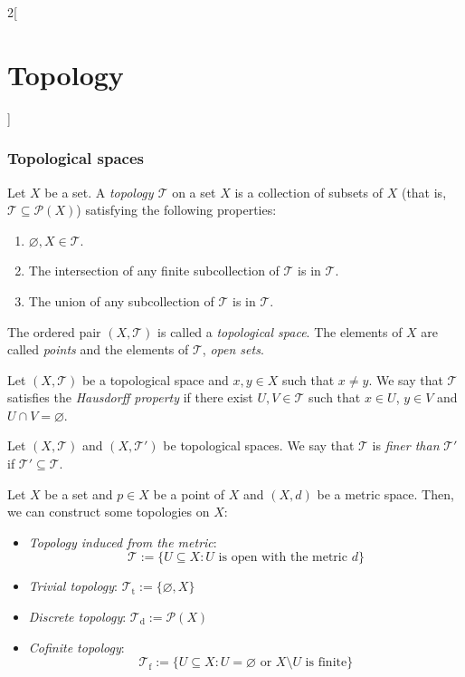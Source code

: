 \documentclass[../../../main.tex]{subfiles}
\begin{document}
\begin{multicols}{2}[\section{Topology}]
  \subsubsection{Topological spaces}
  \begin{definition}
    Let $X$ be a set. A \textit{topology $\mathcal{T}$} on a set $X$ is a collection of subsets of $X$ (that is, $\mathcal{T}\subseteq\mathcal{P}(X)$) satisfying the following properties:
    \begin{enumerate}
      \item $\varnothing, X\in\mathcal{T}$.
      \item The intersection of any finite subcollection of $\mathcal{T}$ is in $\mathcal{T}$.
      \item The union of any subcollection of $\mathcal{T}$ is in $\mathcal{T}$.
    \end{enumerate}
    The ordered pair $(X,\mathcal{T})$ is called a \textit{topological space}. The elements of $X$ are called \textit{points} and the elements of $\mathcal{T}$, \textit{open sets}.
  \end{definition}
  \begin{definition}
    Let $(X,\mathcal{T})$ be a topological space and $x,y\in X$ such that $x\ne y$. We say that $\mathcal{T}$ satisfies the \textit{Hausdorff property} if there exist $U,V\in\mathcal{T}$ such that $x\in U$, $y\in V$ and $U\cap V=\varnothing$.
  \end{definition}
  \begin{definition}
    Let $(X,\mathcal{T})$ and $(X,\mathcal{T}')$ be topological spaces. We say that $\mathcal{T}$ is \textit{finer than} $\mathcal{T}'$ if $\mathcal{T}'\subseteq\mathcal{T}$.
  \end{definition}
  \begin{prop}
    Let $X$ be a set and $p\in X$ be a point of $X$ and $(X,d)$ be a metric space. Then, we can construct some topologies on $X$:
    \begin{itemize}
      \item \textit{Topology induced from the metric}: $$\mathcal{T}:=\{U\subseteq X:U\text{ is open with the metric }d\}$$
      \item \textit{Trivial topology}: $\mathcal{T}_\text{t}:=\{\varnothing,X\}$
      \item \textit{Discrete topology}: $\mathcal{T}_\text{d}:=\mathcal{P}(X)$
      \item \textit{Cofinite topology}: $$\mathcal{T}_\text{f}:=\{U\subseteq X:U=\varnothing\text{ or }X\setminus U\text{ is finite}\}$$

\end{itemize}
\end{prop}
\end{multicols}
\end{document}
